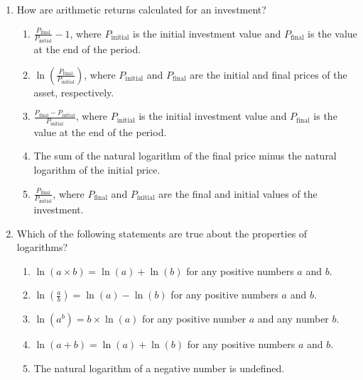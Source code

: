 \documentclass{article}
\begin{document}
\begin{enumerate}
    \item How are arithmetic returns calculated for an investment?
    \begin{enumerate}
        \item \(\frac{P_{\text{final}}}{P_{\text{initial}}} - 1\), where \(P_{\text{initial}}\) is the initial investment value and \(P_{\text{final}}\) is the value at the end of the period.
        \item \(\ln(\frac{P_{\text{final}}}{P_{\text{initial}}})\), where \(P_{\text{initial}}\) and \(P_{\text{final}}\) are the initial and final prices of the asset, respectively.
        \item \(\frac{P_{\text{final}} - P_{\text{initial}}}{P_{\text{initial}}}\), where \(P_{\text{initial}}\) is the initial investment value and \(P_{\text{final}}\) is the value at the end of the period.
        \item The sum of the natural logarithm of the final price minus the natural logarithm of the initial price.
        \item \(\frac{P_{\text{final}}}{P_{\text{initial}}}\), where \(P_{\text{final}}\) and \(P_{\text{initial}}\) are the final and initial values of the investment.
    \end{enumerate}

    \item Which of the following statements are true about the properties of logarithms?
    \begin{enumerate}
        \item \(\ln(a \times b) = \ln(a) + \ln(b)\) for any positive numbers \(a\) and \(b\).
        \item \(\ln\left(\frac{a}{b}\right) = \ln(a) - \ln(b)\) for any positive numbers \(a\) and \(b\).
        \item \(\ln(a^b) = b \times \ln(a)\) for any positive number \(a\) and any number \(b\).
        \item \(\ln(a + b) = \ln(a) + \ln(b)\) for any positive numbers \(a\) and \(b\).
        \item The natural logarithm of a negative number is undefined.
    \end{enumerate}


\end{enumerate}
\end{document}
